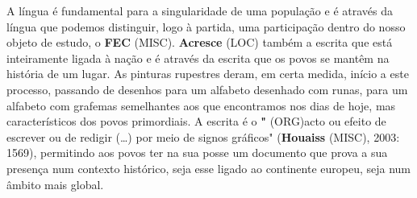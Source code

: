 \documentclass[12pt,a4paper]{article}
\begin{document}
A  língua  é  fundamental  para  a  singularidade  de  uma  população  e  é  através  da língua que podemos distinguir, logo à partida, uma participação dentro do nosso objeto de  estudo,  o  \textbf{FEC} (MISC).  \textbf{Acresce} (LOC)  também  a  escrita  que  está  inteiramente  ligada  à  nação  e  é através da escrita que os povos se mantêm na história de um lugar. As pinturas rupestres deram, em certa medida, início a este processo, passando de desenhos para um alfabeto desenhado com runas, para um alfabeto com grafemas semelhantes aos que encontramos nos dias de hoje, mas característicos dos povos primordiais. A escrita é o \textbf{"} (ORG)acto ou efeito de  escrever  ou  de  redigir  (…)  por  meio  de  signos  gráficos"  (\textbf{Houaiss} (MISC),  2003:  1569), permitindo  aos  povos  ter  na  sua  posse  um  documento  que  prova  a  sua  presença  num contexto histórico, seja esse ligado ao continente europeu, seja num âmbito mais global.
\end{document}
